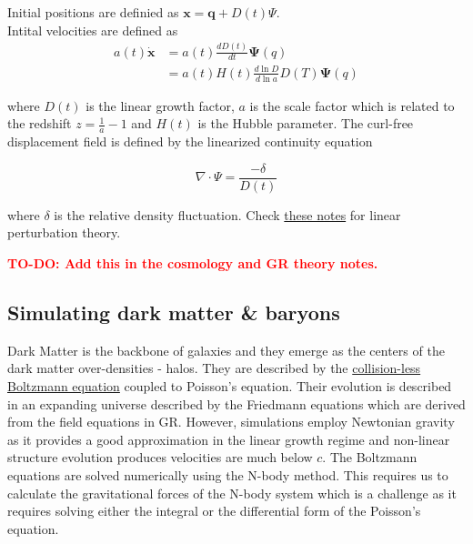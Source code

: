 \documentclass{book}
\newcommand{\todo}[1]{\textcolor{red}{\textbf{TO-DO: #1}}}
\begin{document}
\begin{mybox}[title={Initial conditions}]
Initial positions are definied as $\mathbf{x} = \mathbf{q} + D(t) \Psi $.\\
Intital velocities are defined as 
\begin{align}
    a(t) \dot{\mathbf{x}} &= a(t) \frac{d D(t)}{d t} \mathbf{\Psi}(q)\\
    &= a(t) H(t) \frac{d \ln{D}}{d \ln{a}} D(T) \mathbf{\Psi}(q)
\end{align}

where $D(t)$ is the linear growth factor, $a$ is the scale factor which is related to the redshift $z = \frac{1}{a}-1$ and $H
(t)$ is the Hubble parameter. The curl-free displacement field is defined by the linearized continuity equation

\begin{equation}
    \nabla \cdot \Psi = \frac{- \delta}{D(t)}
\end{equation}

where $\delta$ is the relative density fluctuation. Check \href{https://www.astro.rug.nl/~weygaert/tim1publication/lss2009/lss2009.linperturb.pdf}{these notes} for linear perturbation theory. 

\todo{Add this in the cosmology and GR theory notes.}

\end{mybox}
\subsection{Simulating dark matter \& baryons}
Dark Matter is the backbone of galaxies and they emerge as the centers of the dark matter over-densities - halos. They are described by the \href{https://web.physics.ucsb.edu/~mccann/notes/Virial.pdf}{ collision-less Boltzmann equation} coupled to Poisson's equation. Their evolution is described in an expanding universe described by the Friedmann equations which are derived from the field equations in GR. However, simulations employ Newtonian gravity as it provides a good approximation in the linear growth regime and non-linear structure evolution produces velocities are much below $c$. The Boltzmann equations are solved numerically using the N-body method. This requires us to calculate the gravitational forces of the N-body system which is a challenge as it requires solving either the integral or the differential form of the Poisson's equation.
\end{document}
